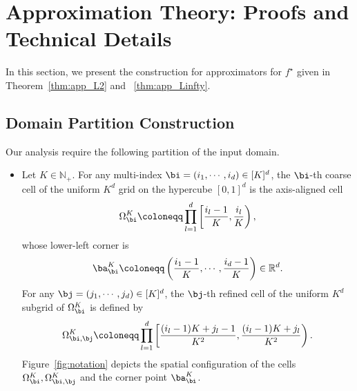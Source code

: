 \documentclass[11pt]{article}
\begin{document}
\section{Approximation Theory: Proofs and Technical Details}
\label{app:approximation}
In this section, we present the construction for approximators for $f^{\star}$ given in Theorem~\ref{thm:app_L2} and ~\ref{thm:app_Linfty}.

\subsection{Domain Partition Construction}
Our analysis require the following partition of the input domain.
\begin{itemize}
    \item Let $K \in \mathbb{N}_{+}$. For any multi-index $\bi = (i_1, \cdots, i_d) \in [K]^{d}$, the $\bi$-th coarse cell of the uniform $K^d$ grid on the hypercube $[0,1]^d$ is the axis-aligned cell
     \begin{equation*}
        \Omega^{K}_{\bi} \coloneqq  \prod_{l=1}^d \left[ \frac{i_l-1}{K}, \frac{i_l}{K} \right),
    \end{equation*}
    whose lower-left corner is
    \begin{equation*}
        \ba_{\bi}^{K} \coloneqq  \left( \frac{i_1 -1}{K}, \cdots, \frac{i_d -1}{K}\right) \in \mathbb{R}^d.
    \end{equation*}
    For any $\bj = (j_1 , \cdots, j_d) \in [K]^d$, the $\bj$-th refined cell of the uniform $K^d$ subgrid of $\Omega_{\bi}^{K}$ is defined by 
    \begin{equation*}
        \Omega_{\bi, \bj}^{K} \coloneqq  \prod_{l=1}^d \left[ \frac{(i_l-1)K + j_l -1 }{K^2}, \frac{ (i_l-1)K + j_l }{K^2} \right).
    \end{equation*}
    Figure~\ref{fig:notation} depicts the spatial configuration of the cells $\Omega_{\bi}^K, \Omega_{\bi,\bj}^K$ and the corner point $\ba_{\bi}^K$.
    


\end{itemize}
\end{document}
